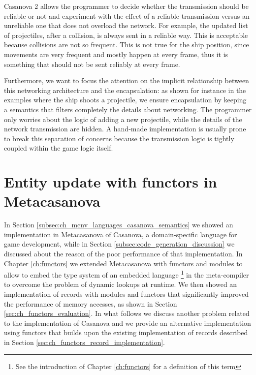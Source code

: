 Casanova 2 allows the programmer to decide whether the transmission should be reliable or not and experiment with the effect of a reliable transmission versus an unreliable one that does not overload the network. For example, the updated list of projectiles, after a collision, is always sent in a reliable way. This is acceptable because collisions are not so frequent. This is not true for the ship position, since movements are very frequent and mostly happen at every frame, thus it is something that should not be sent reliably at every frame.

Furthermore, we want to focus the attention on the implicit relationship between this networking architecture and the encapsulation: as shown for instance in the examples where the ship shoots a projectile, we ensure encapsulation by keeping a semantics that filters completely the details about networking. The programmer only worries about the logic of adding a new projectile, while the details of the network transmission are hidden. A hand-made implementation is usually prone to break this separation of concerns because the transmission logic is tightly coupled within the game logic itself.

\section{Entity update with functors in Metacasanova}
\label{sec:ch_networing_entity_update_functors}
In Section \ref{subsec:ch_mcnv_languages_casanova_semantics} we showed an implementation in Metacasanova of Casanova, a domain-specific language for game development, while in Section \ref{subsec:code_generation_discussion} we discussed about the reason of the poor performance of that implementation. In Chapter \ref{ch:functors} we extended Metacasanova with functors and modules to allow to embed the type system of an embedded  language \footnote{See the introduction of Chapter \ref{ch:functors} for a definition of this term} in the meta-compiler to overcome the problem of dynamic lookups at runtime. We then showed an implementation of records with modules and functors that significantly improved the performance of memory accesses, as shown in Section \ref{sec:ch_functors_evaluation}. In what follows we discuss another problem related to the implementation of Casanova and we provide an alternative implementation using functors that builds upon the existing implementation of records described in Section \ref{sec:ch_functors_record_implementation}.

